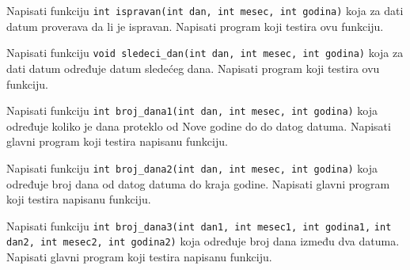 \begin{Exercise}[label=p1.4_] 
Napisati funkciju \verb|int ispravan(int dan, int mesec, int godina)|
koja za dati datum proverava da li je ispravan. Napisati program koji testira ovu funkciju. \\ 
\end{Exercise}
\begin{Answer}[ref=p1.4_]
\end{Answer}


\begin{Exercise}[label=p1.4_] 
Napisati funkciju
\verb|void sledeci_dan(int dan, int mesec, int godina)| koja za dati
datum određuje datum slede\'ceg dana. Napisati program koji testira ovu funkciju. \\ 
\end{Exercise}
\begin{Answer}[ref=p1.4_]
\end{Answer}

\begin{Exercise}[label=p1.4_] 
Napisati funkciju
\verb|int broj_dana1(int dan, int mesec, int godina)| koja određuje koliko je dana proteklo od Nove godine do 
do datog datuma. Napisati glavni program koji testira napisanu funkciju. \\ 
\end{Exercise}
\begin{Answer}[ref=p1.4_]
\end{Answer}

\begin{Exercise}[label=p1.4_] 
Napisati funkciju
\verb|int broj_dana2(int dan, int mesec, int godina)| koja određuje broj dana od datog datuma do kraja godine. Napisati glavni program koji testira napisanu funkciju. \\ 
\end{Exercise}
\begin{Answer}[ref=p1.4_]
\end{Answer}

\begin{Exercise}[label=p1.4_] 
Napisati funkciju
\verb|int broj_dana3(int dan1, int mesec1, int godina1,|
\verb|int dan2, int mesec2, int godina2)| koja određuje broj dana
između dva datuma. Napisati glavni program koji testira napisanu funkciju. \\ 
\end{Exercise}
\begin{Answer}[ref=p1.4_]
\end{Answer}


